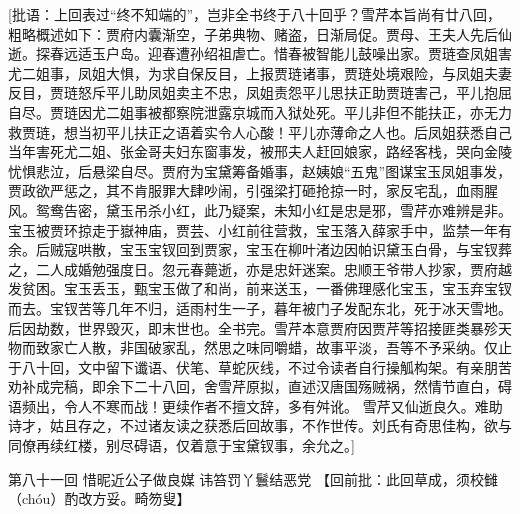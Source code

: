\documentclass[12pt,oneside]{book}
\begin{document}
 
[批语：上回表过“终不知端的”，岂非全书终于八十回乎？雪芹本旨尚有廿八回，粗略概述如下：贾府内囊渐空，子弟典物、赌盗，日渐局促。贾母、王夫人先后仙逝。探春远适玉户岛。迎春遭孙绍祖虐亡。惜春被智能儿鼓噪出家。贾琏查凤姐害尤二姐事，凤姐大惧，为求自保反目，上报贾琏诸事，贾琏处境艰险，与凤姐夫妻反目，贾琏怒斥平儿助凤姐卖主不忠，凤姐责怨平儿思扶正助贾琏害己，平儿抱屈自尽。贾琏因尤二姐事被都察院泄露京城而入狱处死。平儿非但不能扶正，亦无力救贾琏，想当初平儿扶正之语着实令人心酸！平儿亦薄命之人也。后凤姐获悉自己当年害死尤二姐、张金哥夫妇东窗事发，被邢夫人赶回娘家，路经客栈，哭向金陵忧惧悲泣，后悬梁自尽。贾府为宝黛筹备婚事，赵姨娘“五鬼”图谋宝玉凤姐事发，贾政欲严惩之，其不肯服罪大肆吵闹，引强梁打砸抢掠一时，家反宅乱，血雨腥风。鸳鸯告密，黛玉吊杀小红，此乃疑案，未知小红是忠是邪，雪芹亦难辨是非。宝玉被贾环掠走于嶽神庙，贾芸、小红前往营救，宝玉落入薛家手中，监禁一年有余。后贼寇哄散，宝玉宝钗回到贾家，宝玉在柳叶渚边因帕识黛玉白骨，与宝钗葬之，二人成婚勉强度日。忽元春薨逝，亦是忠奸迷案。忠顺王爷带人抄家，贾府越发贫困。宝玉丢玉，甄宝玉做了和尚，前来送玉，一番佛理感化宝玉，宝玉弃宝钗而去。宝钗苦等几年不归，适雨村生一子，暮年被门子发配东北，死于冰天雪地。后因劫数，世界毁灭，即末世也。全书完。雪芹本意贾府因贾芹等招接匪类暴殄天物而致家亡人散，非国破家乱，然思之味同嚼蜡，故事平淡，吾等不予采纳。仅止于八十回，文中留下谶语、伏笔、草蛇灰线，不过令读者自行操觚构架。有亲朋苦劝补成完稿，即余下二十八回，舍雪芹原拟，直述汉唐国殇贼祸，然情节直白，碍语频出，令人不寒而战！更续作者不擅文辞，多有舛讹。 雪芹又仙逝良久。难助诗才，姑且存之，不过诸友读之获悉后回故事，不作世传。刘氏有奇思佳构，欲与同僚再续红楼，别尽碍语，仅着意于宝黛钗事，余允之。]

第八十一回 惜昵近公子做良媒 讳笞罚丫鬟结恶党
【回前批：此回草成，须校雠（chóu）酌改方妥。畸笏叟】
\end{document}
